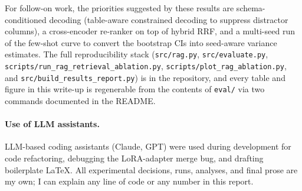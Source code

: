 \documentclass[11pt,a4paper]{article}
\begin{document}
For follow-on work, the priorities suggested by these results are
schema-conditioned decoding (table-aware constrained decoding to suppress
distractor columns), a cross-encoder re-ranker on top of hybrid RRF, and a
multi-seed run of the few-shot curve to convert the bootstrap CIs into
seed-aware variance estimates. The full reproducibility stack
(\texttt{src/rag.py}, \texttt{src/evaluate.py},
\texttt{scripts/run\_rag\_retrieval\_ablation.py},
\texttt{scripts/plot\_rag\_ablation.py}, and
\texttt{src/build\_results\_report.py}) is in the repository, and every
table and figure in this write-up is regenerable from the contents of
\texttt{eval/} via two commands documented in the README.

\paragraph{Use of LLM assistants.}
LLM-based coding assistants (Claude, GPT) were used during development for
code refactoring, debugging the LoRA-adapter merge bug, and drafting boilerplate
LaTeX. All experimental decisions, runs, analyses, and final prose are my own;
I can explain any line of code or any number in this report.
\end{document}
